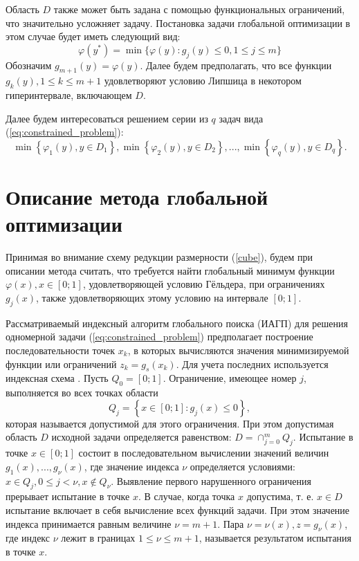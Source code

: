 \documentclass{cmi}
\begin{document}
Область \(D\) также может быть задана с помощью функциональных ограничений, что
значительно усложняет задачу.
Постановка задачи глобальной оптимизации в этом случае будет иметь следующий вид:
\begin{equation}
  \label{eq:constrained_problem}
  \varphi(y^*)=\min\{\varphi(y):g_j(y)\leqslant 0, 1\leqslant j\leqslant m\}
\end{equation}
Обозначим \(g_{m+1}(y)=\varphi(y)\). Далее будем предполагать, что все функции \(g_k(y),1\leqslant k \leqslant m+1\)
удовлетворяют условию Липшица в некотором гиперинтервале, включающем \(D\).

Далее будем интересоваться решением серии из \(q\) задач вида (\ref{eq:constrained_problem}):
\begin{equation}
  \label{eq:many_problems}
  \min\left\{\varphi_1(y), y\in D_1 \right\}, \min\left\{\varphi_2(y), y\in D_2\right\},..., \min\left\{\varphi_q(y), y\in D_q\right\}.
\end{equation}

\section{Описание метода глобальной оптимизации}

Принимая во внимание схему редукции размерности (\ref{cube}), будем при описании метода считать, что
требуется найти глобальный минимум функции \(\varphi(x), x\in[0;1]\),
удовлетворяющей условию Гёльдера, при ограничениях \(g_j(x)\), также
удовлетворяющих этому условию на интервале \([0;1]\).

Рассматриваемый индексный алгоритм глобального поиска (ИАГП) для решения
одномерной задачи (\ref{eq:constrained_problem}) предполагает построение последовательности
точек \(x_k\), в которых вычисляются значения минимизируемой функции или ограничений \(z_k = g_s(x_k)\).
Для учета последних используется индексная схема \cite{Strongin2000}. Пусть \(Q_0=[0;1]\). Ограничение, имеющее номер
 \(j\), выполняется во всех точках области
\begin{displaymath}
  Q_j=\left\{x\in [0;1]:g_j(x)\leq 0\right\},
\end{displaymath}
которая называется допустимой для этого ограничения. При этом допустимая область \(D\)
исходной задачи определяется равенством: \(D=\cap _{j=0}^{m}Q_{j}\).
Испытание в точке \(x\in [0;1]\) состоит в последовательном вычислении значений
величин \(g_{1}(x),...,g_{\nu }(x)\), где значение индекса \(\nu\) определяется условиями:
\(x\in Q_{j},0\leqslant j<\nu ,x\notin Q_{\nu }\). Выявление первого нарушенного ограничения
прерывает испытание в точке \(x\). В случае, когда точка \(x\)  допустима, т. е.
\(x\in D\) испытание включает в себя вычисление всех функций задачи. При этом значение
индекса принимается равным величине \(\nu =m+1\). Пара \(\nu =\nu (x),z=g_{\nu }(x)\),
где индекс \(\nu\) лежит в границах \(1\leqslant \nu \leqslant m+1\), называется результатом
испытания в точке \(x\).
\end{document}
